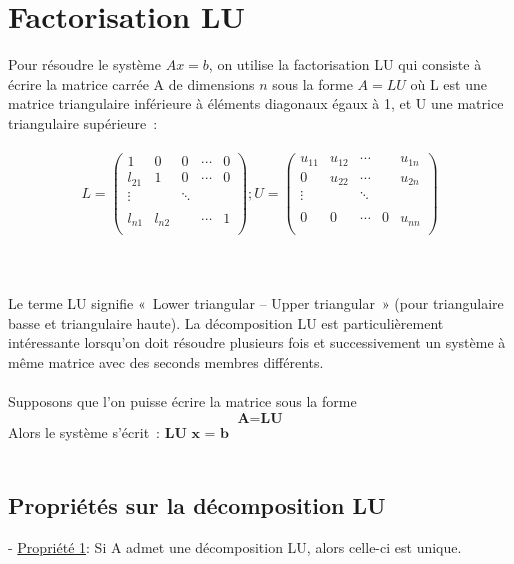 \documentclass[a4paper,12pt]{report}
\begin{document}
\section{Factorisation LU} 


Pour résoudre le système $A x = b$, on utilise la factorisation LU qui consiste à écrire la matrice carrée A de dimensions $n$ sous la forme $A = LU$ où L est une matrice triangulaire inférieure à éléments diagonaux égaux à 1, et U une matrice triangulaire supérieure :
\\
\\
$$
L=\begin{pmatrix}
1 & 0 & 0 & \cdots & 0 \\
l_{21} & 1 & 0 & \cdots & 0\\
\vdots &   & \ddots \\
& & & & \\
l_{n1} & l_{n2} &  &\cdots & 1\\
\end{pmatrix}
;       
U=\begin{pmatrix}
u_{11} & u_{12} & \cdots & & u_{1n} \\
0 & u_{22} & \cdots & & u_{2n}\\
\vdots & & \ddots \\
& & & & \\
0 & 0 & \cdots & 0 & u_{nn}\\
\end{pmatrix}
$$\\
\\
\\
Le terme LU signifie « Lower triangular – Upper triangular » (pour triangulaire basse et triangulaire haute).
La décomposition LU est particulièrement intéressante lorsqu’on doit résoudre plusieurs fois et successivement un système à même matrice avec des seconds membres différents.
\\
\\
Supposons que l'on puisse écrire la matrice sous la forme $$\textbf{A=LU}$$
Alors le système s’écrit : $\textbf{LU x = b}$
\\
\\

\subsection{Propriétés sur la décomposition LU} 

- \underline{Propriété 1}: Si A admet une décomposition LU, alors celle-ci est unique.\\ 
\end{document}
